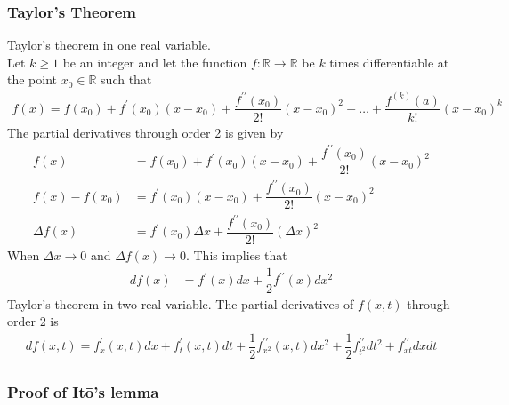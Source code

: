 \subsubsection*{Taylor's Theorem}

Taylor's theorem in one real variable. \\
Let $k \geq 1$ be an integer and let the function $f : \mathbb{R} \to \mathbb{R}$ be $k$ times differentiable at the point $x_0 \in \mathbb{R}$ such that 
\begin{align*}
f(x)=f(x_0)+f^{\prime}(x_0)(x-x_0)+\dfrac{f^{\prime \prime}(x_0)}{2!}(x-x_0)^2+\dots+\dfrac{f^{(k)}(a)}{k!}(x-x_0)^k
\end{align*}
The partial derivatives through order 2 is given by
\begin{align*}
f(x)&=f(x_0)+f^{\prime}(x_0)(x-x_0)+\dfrac{f^{\prime \prime}(x_0)}{2!}(x-x_0)^2\\
f(x)-f(x_0)&=f^{\prime}(x_0)(x-x_0)+\dfrac{f^{\prime \prime}(x_0)}{2!}(x-x_0)^2\\
\Delta f(x)&=f^{\prime}(x_0)\Delta x+\dfrac{f^{\prime \prime}(x_0)}{2!}(\Delta x)^2
\end{align*}
When $\Delta x \rightarrow 0$ and $\Delta f(x) \rightarrow 0$.  This implies that
\begin{align*}
df(x)&=f^{\prime}(x)dx+\dfrac{1}{2}f^{\prime \prime}(x)dx^2
\end{align*}
Taylor's theorem in two real variable.  The partial derivatives of $f(x,t)$ through order 2 is 
\begin{align*}
df(x,t)=f^{\prime}_x(x,t)dx+f^{\prime}_t(x,t)dt+\dfrac{1}{2}f^{\prime \prime}_{x^2}(x,t)dx^2+\dfrac{1}{2}f^{\prime \prime}_{t^2}dt^2+f^{\prime \prime}_{xt}dxdt
\end{align*} 

\subsubsection*{Proof of It\=o's lemma}


